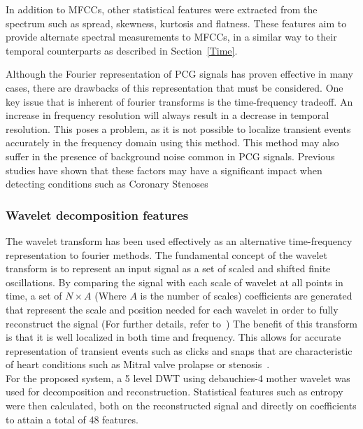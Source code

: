 \documentclass[titlepage, 12pt]{scrartcl} \usepackage{enumitem}
\begin{document}
In addition to MFCCs, other statistical features were extracted from the
spectrum such as spread, skewness, kurtosis and flatness. These features aim to
provide alternate spectral measurements to MFCCs, in a similar way to their
temporal counterparts as described in Section~\ref{Time}.

Although the Fourier representation of PCG signals has proven effective in many
cases, there are drawbacks of this representation that must be considered. One
key issue that is inherent of fourier transforms is the time-frequency
tradeoff. An increase in frequency resolution will always result in a decrease
in temporal resolution. This poses a problem, as it is not possible to localize
transient events accurately in the frequency domain using this method. This
method may also suffer in the presence of background noise common in PCG
signals. Previous studies have shown that these factors may have a significant
impact when detecting conditions such as Coronary
Stenoses~\parencite{Ergen2001, Akay1990}

\subsubsection{Wavelet decomposition features}
The wavelet transform has been used effectively as an alternative
time-frequency representation to fourier methods. The fundamental concept of
the wavelet transform is to represent an input signal as a set of scaled and
shifted finite oscillations. By comparing the signal with each scale of wavelet
at all points in time, a set of $N\times A$ (Where $A$ is the number of scales)
coefficients are generated that represent the scale and position needed for
each wavelet in order to fully reconstruct the signal (For further details,
refer to~\parencite{Polikar1994}) The benefit of this transform is that it is
well localized in both time and frequency. This allows for accurate
representation of transient events such as clicks and snaps that are
characteristic of heart conditions such as Mitral valve prolapse or
stenosis~\parencite{Brown2008}.\\
For the proposed system, a 5 level DWT using debauchies-4 mother wavelet was
used for decomposition and reconstruction. Statistical features such as entropy
were then calculated, both on the reconstructed signal and directly on
coefficients to attain a total of 48 features.~\parencite{Homsi2016}
\end{document}
